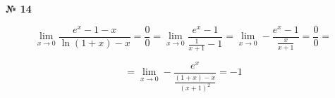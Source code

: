 \documentclass{article}
\begin{document}
\textbf{№ 14} 

\begingroup
\Large

$$ \lim\limits_{x \to 0} \frac{e^x-1-x}{\ln{(1+x)} - x}
= \frac{0}{0} 
= \lim\limits_{x \to 0} \frac{e^x-1}{\frac{1}{x+1} - 1}
= \lim\limits_{x \to 0} -\frac{e^x-1}{\frac{x}{x+1}}
= \frac{0}{0}
= $$

$$ = \lim\limits_{x \to 0} -\frac{e^x}{\frac{(1+x)-x}{(x+1)^2}}
= -1 $$

\endgroup
\end{document}
